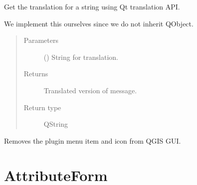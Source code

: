 \documentclass[letterpaper,10pt,english]{sphinxmanual}
\begin{document}
\begin{fulllineitems}
\begin{fulllineitems}
\end{fulllineitems}


\begin{fulllineitems}
\label{\detokenize{code:Tilgjengelighet.Tilgjengelighet.tr}}
Get the translation for a string using Qt translation API.

We implement this ourselves since we do not inherit QObject.
\begin{quote}\begin{description}
\item[{Parameters}] \leavevmode
{} (\sphinxstyleliteralemphasis{\sphinxupquote{, }}) \textendash{} String for translation.

\item[{Returns}] \leavevmode
Translated version of message.

\item[{Return type}] \leavevmode
QString

\end{description}\end{quote}

\end{fulllineitems}


\begin{fulllineitems}
\label{\detokenize{code:Tilgjengelighet.Tilgjengelighet.unload}}
Removes the plugin menu item and icon from QGIS GUI.

\end{fulllineitems}


\end{fulllineitems}



\section{AttributeForm}
\label{\detokenize{code:module-AttributeForm}}\label{\detokenize{code:attributeform}}
\end{document}
